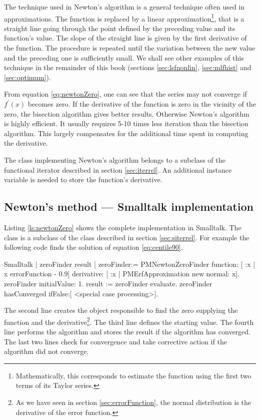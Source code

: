 The technique used in Newton's algorithm is a general technique
often used in approximations. The function is replaced by a linear
approximation\footnote{Mathematically, this corresponds to
estimate the function using the first two terms of its Taylor
series.}, that is a straight line going through the point defined
by the preceding value and its function's value. The slope of the
straight line is given by the first derivative of the function.
The procedure is repeated until the variation between the new
value and the preceding one is sufficiently small.
We shall see other examples of this technique in the remainder of this book
(\cf sections \ref{sec:lsfnonlin}, \ref{sec:mlfhist} and
\ref{sec:optimum}).

From equation \ref{eq:newtonZero}, one can see that the series may
not converge if $f^{\prime}\left(x\right)$ becomes zero. If the
derivative of the function is zero in the vicinity of the zero,
the bisection algorithm gives better results. Otherwise Newton's
algorithm is highly efficient. It usually requires 5-10 times less
iteration than the bisection algorithm. This largely compensates
for the additional time spent in computing the derivative.

The class implementing Newton's algorithm belongs to a subclass of
the functional iterator described in section \ref{sec:iterrel}. An
additional instance variable is needed to store the function's
derivative.

\subsection{Newton's method --- Smalltalk implementation}
\label{sec:snewton} Listing \ref{ls:newtonZero} shows the complete
implementation in Smalltalk. The class 
is a subclass of the class  described
in section \ref{sec:siterrel}. For example the following code
finds the solution of equation \ref{eq:centile90}.

\begin{displaycode}{Smalltalk}
| zeroFinder result |
zeroFinder:= PMNewtonZeroFinder
            function: [ :x | x errorFunction - 0.9]
            derivative: [ :x | PMErfApproximation new normal: x].
zeroFinder initialValue: 1.
result := zeroFinder evaluate.
zeroFinder hasConverged
   ifFalse:[ <special case processing>].
\end{displaycode}
The second line creates the object responsible to find the zero
supplying the function and the derivative\footnote{As we have seen
in section \ref{sec:errorFunction}, the normal distribution is the
derivative of the error function.}. The third line defines the
starting value. The fourth line performs the algorithm and stores
the result if the algorithm has converged. The last two lines
check for convergence and take corrective action if the algorithm
did not converge.

